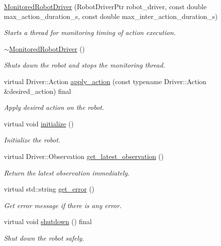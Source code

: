 \begin{DoxyCompactItemize}
\item 
\hyperlink{classrobot__interfaces_1_1MonitoredRobotDriver_a2ea1456e85ad7596295cb047e552dc06}{Monitored\+Robot\+Driver} (Robot\+Driver\+Ptr robot\+\_\+driver, const double max\+\_\+action\+\_\+duration\+\_\+s, const double max\+\_\+inter\+\_\+action\+\_\+duration\+\_\+s)
\begin{DoxyCompactList}\small\item\em Starts a thread for monitoring timing of action execution. \end{DoxyCompactList}\item 
\hyperlink{classrobot__interfaces_1_1MonitoredRobotDriver_a07dfd2cc6f1dc07fad82914814a43188}{$\sim$\+Monitored\+Robot\+Driver} ()\hypertarget{classrobot__interfaces_1_1MonitoredRobotDriver_a07dfd2cc6f1dc07fad82914814a43188}{}\label{classrobot__interfaces_1_1MonitoredRobotDriver_a07dfd2cc6f1dc07fad82914814a43188}

\begin{DoxyCompactList}\small\item\em Shuts down the robot and stops the monitoring thread. \end{DoxyCompactList}\item 
virtual Driver\+::\+Action \hyperlink{classrobot__interfaces_1_1MonitoredRobotDriver_a3f0f7cbf74236e91d33dcfc08206b5e9}{apply\+\_\+action} (const typename Driver\+::\+Action \&desired\+\_\+action) final
\begin{DoxyCompactList}\small\item\em Apply desired action on the robot. \end{DoxyCompactList}\item 
virtual void \hyperlink{classrobot__interfaces_1_1MonitoredRobotDriver_a47b68c24afaa087e4e60e6413ab7ac89}{initialize} ()
\begin{DoxyCompactList}\small\item\em Initialize the robot. \end{DoxyCompactList}\item 
virtual Driver\+::\+Observation \hyperlink{classrobot__interfaces_1_1MonitoredRobotDriver_a97774dddcda1038f338d18ef0b572ad8}{get\+\_\+latest\+\_\+observation} ()
\begin{DoxyCompactList}\small\item\em Return the latest observation immediately. \end{DoxyCompactList}\item 
virtual std\+::string \hyperlink{classrobot__interfaces_1_1MonitoredRobotDriver_a944425cc7e0845184f33b16405a9e61e}{get\+\_\+error} ()
\begin{DoxyCompactList}\small\item\em Get error message if there is any error. \end{DoxyCompactList}\item 
virtual void \hyperlink{classrobot__interfaces_1_1MonitoredRobotDriver_a95714a60e69a3ac06461382a7b391289}{shutdown} () final
\begin{DoxyCompactList}\small\item\em Shut down the robot safely. \end{DoxyCompactList}\end{DoxyCompactItemize}
